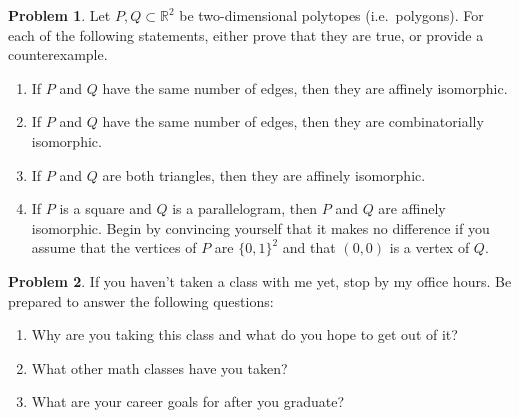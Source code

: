 \documentclass[letterpaper,11pt]{amsart}
\theoremstyle{plain}
\theoremstyle{definition}
\newtheorem{pr}{Problem}
\theoremstyle{remark}
\begin{document}
\vspace{.5cm}


\begin{pr}
    Let $P,Q \subset \mathbb{R}^2$ be two-dimensional polytopes (i.e.~polygons).
    For each of the following statements, either prove that they are true, or provide a counterexample.
    \begin{enumerate}
        \item If $P$ and $Q$ have the same number of edges, then they are affinely isomorphic.
        \item If $P$ and $Q$ have the same number of edges, then they are combinatorially isomorphic.
        \item If $P$ and $Q$ are both triangles, then they are affinely isomorphic.
        \item If $P$ is a square and $Q$ is a parallelogram, then $P$ and $Q$ are affinely isomorphic.
        Begin by convincing yourself that it makes no difference if you assume that the vertices of $P$ are $\{0,1\}^2$ and that
        $(0,0)$ is a vertex of $Q$.
    \end{enumerate}
\end{pr}

\begin{pr}
    If you haven't taken a class with me yet, stop by my office hours.
    Be prepared to answer the following questions:
    \begin{enumerate}
        \item Why are you taking this class and what do you hope to get out of it?
        \item What other math classes have you taken?
        \item What are your career goals for after you graduate?
    \end{enumerate}
\end{pr}
\end{document}
